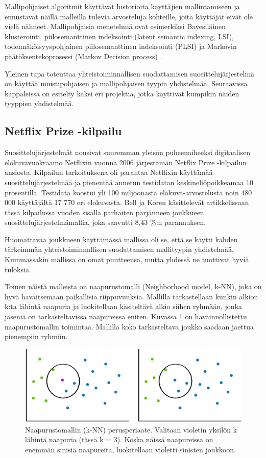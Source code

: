 \documentclass[12pt,finnish]{tktltiki2}
\theoremstyle{definition}
\theoremstyle{remark}
\begin{document}
Mallipohjaiset algoritmit käyttävät historioita käyttäjien mallintamiseen ja ennustavat näillä malleilla tulevia arvosteluja kohteille, joita käyttäjät eivät ole vielä nähneet. Mallipohjaisia menetelmiä ovat esimerkiksi Bayesiläinen klusterointi, piilosemanttinen indeksointi (latent semantic indexing, LSI), todennäköisyyspohjainen piilosemanttinen indeksointi (PLSI) ja Markovin päätöksentekoprosessi (Markov Decision process) \cite{Das:2007:GNP:1242572.1242610}.
        
Yleinen tapa toteuttaa yhteistoiminnallisen suodattamisen suosittelujärjestelmä on käyttää muistipohjaisen ja mallipohjaisen tyypin yhdistelmää. Seuraavissa kappaleissa on esitelty kaksi eri projektia, jotka käyttivät kumpikin näiden tyyppien yhdistelmää.

\subsection{Netflix Prize -kilpailu}

        Suosittelujärjestelmät nousivat suuremman yleisön puheenaiheeksi digitaalisen elokuvavuokraamo Netflixin vuonna 2006 järjestämän Netflix Prize -kilpailun ansiosta. Kilpailun tarkoituksena oli parantaa Netflixin käyttämää suosittelujärjestelmää ja pienentää annetun testidatan keskineliöpoikkeamaa 10 prosentilla. Testidata koostui yli 100 miljoonasta elokuva-arvostelusta noin 480 000 käyttäjältä 17 770 eri elokuvasta. Bell ja Koren käsittelevät artikkelissaan ~\cite{Bell:2007:LNP:1345448.1345465} tässä kilpailussa vuoden sisällä parhaiten pärjänneen joukkueen suosittelujärjestelmämallia, joka saavutti 8,43 \%:n parannuksen.
        
        Huomattavaa joukkueen käyttämässä mallissa oli se, että se käytti kahden tärkeimmän yhteistoiminnallisen suodattamisen mallityypin yhdistelmää. Kummassakin mallissa on omat puutteensa, mutta yhdessä ne tuottivat hyviä tuloksia.
        
        Toinen näistä malleista on naapurustomalli (Neighborhood model, k-NN), joka on hyvä havaitsemaan paikallisia riippuvuuksia. Mallilla tarkastellaan kunkin alkion k:ta lähintä naapuria ja luokitellaan käsiteltävä alkio siihen ryhmään, jonka jäseniä on tarkasteltavissa naapureissa eniten. Kuvassa \ref{knn} on havainnollistettu naapurustomallin toimintaa. Mallilla koko tarkasteltava joukko saadaan jaettua pienempiin ryhmiin.
        
\begin{figure}[]
\includegraphics[width = 370pt]{knnkumpikin.eps}\caption{Naapurustomallin (k-NN) perusperiaate. Valitaan violetin yksilön k lähintä naapuria (tässä k = 3). Koska näissä naapureissa on enemmän sinisiä naapureita, luokitellaan violetti sinisten joukkoon.}
\label{knn}
\end{figure} 
 
\end{document}
